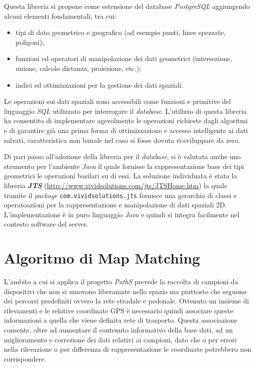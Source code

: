 Questa libreria si propone come estensione del database \emph{PostgreSQL} aggiungendo alcuni elementi fondamentali, tra cui:
\begin{itemize}
\item tipi di dato geometrico e geografico (ad esempio punti, linee spezzate, poligoni);
\item funzioni ed operatori di manipolazione dei dati geometrici (intersezione, unione, calcolo distanza, proiezione, etc.);
\item indici ed ottimizzazioni per la gestione dei dati spaziali.
\end{itemize}
Le operazioni sui dati spaziali sono accessibili come funzioni e primitive del linguaggio \emph{SQL} utilizzato per interrogare il \emph{database}. L'utilizzo di questa libreria ha consentito di implementare agevolmente le operazioni richieste dagli algoritmi e di garantire già una prima forma di ottimizzazione e accesso intelligente ai dati salvati, caratteristica non banale nel caso si fosse dovuta ri-sviluppare da zero.

Di pari passo all'adozione della libreria per il \emph{database}, si è valutata anche uno strumento per l'ambiente \emph{Java} il quale fornisse la rappresentazione base dei tipi geometrici le operazioni basilari su di essi. La soluzione individuata è stata la libreria \textbf{\emph{JTS}} (\url{http://www.vividsolutions.com/jts/JTSHome.htm}) la quale tramite il \emph{package} \texttt{com.\-vividsolutions.\-jts} fornisce una gerarchia di classi e operatoazioni per la rappresentazione e manipolazione di dati spaziali 2D. L'implementazione è in puro linguaggio \emph{Java} e quindi si integra facilmente nel contesto software del server.


\section{Algoritmo di Map Matching}
L'ambito a cui si applica il progetto \emph{PathS} prevede la raccolta di campioni da dispositivi che non si muovono liberamnte nello spazio ma piuttosto che seguono dei percorsi predefiniti ovvero la rete stradale e pedonale. Ottenuto un insieme di rilevamenti e le relative coordinate GPS è necessario quindi associare queste informazioni a quella che viene definita rete di trasporto. Questa associazione consente, oltre ad aumentare il contenuto informativo della base dati, ad un miglioramento e correzione dei dati relativi ai campioni, dato che o per errori nella rilevazione o per differenza di rappresentazione le coordinate potrebbero non corrispondere. 

